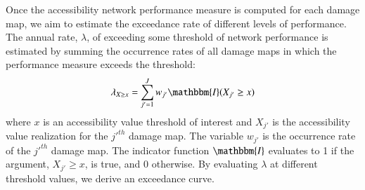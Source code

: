 
Once the accessibility network performance measure is computed for each damage map, we aim to estimate the exceedance rate of different levels of performance. The annual rate, $\lambda$, of exceeding some threshold of network performance is estimated by summing the occurrence rates of all damage maps in which the performance measure exceeds the threshold: 
\begin{equation}
\lambda_{X \geq x} = \sum_{j'=1}^{J} w_{j'} \mathbbm{I}(X_{j'}\geq x)
\label{eq:exceedance}
\end{equation}
where $x$ is an accessibility value threshold of interest and $X_{j'}$ is the accessibility value realization for the $j'^{th}$ damage map. The variable $w_{j'}$ is the occurrence rate of the $j'^{th}$ damage map. %
The indicator function $\mathbbm{I}$  evaluates to 1 if the argument, $X_{j'} \geq x$, is true, and 0 otherwise. By evaluating $\lambda$ at different threshold values, we derive an exceedance curve. 

